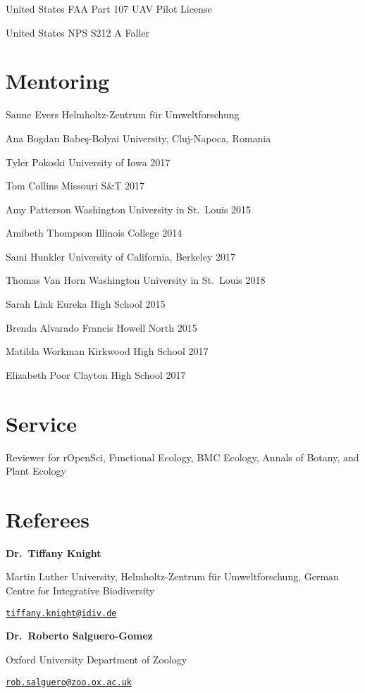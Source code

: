 \documentclass[11pt,]{article}
\begin{document}
United States FAA Part 107 UAV Pilot License

United States NPS S212 A Faller

\hypertarget{mentoring}{%
\section{Mentoring}\label{mentoring}}

Sanne Evers \hfill Helmholtz-Zentrum für Umweltforschung

Ana Bogdan \hfill Babe\c s-Bolyai University, Cluj-Napoca, Romania

Tyler Pokoski \hfill  University of Iowa 2017

Tom Collins \hfill Missouri S\&T 2017

Amy Patterson \hfill Washington University in St.~Louis 2015

Amibeth Thompson \hfill Illinois College 2014

Sami Hunkler \hfill University of California, Berkeley 2017

Thomas Van Horn \hfill Washington University in St.~Louis 2018

Sarah Link \hfill Eureka High School 2015

Brenda Alvarado \hfill Francis Howell North 2015

Matilda Workman \hfill Kirkwood High School 2017

Elizabeth Poor \hfill Clayton High School 2017

\hypertarget{service}{%
\section{Service}\label{service}}

Reviewer for rOpenSci, Functional Ecology, BMC Ecology, Annals of
Botany, and Plant Ecology

\hypertarget{referees}{%
\section{Referees}\label{referees}}

\textbf{Dr.~Tiffany Knight}

Martin Luther University, Helmholtz-Zentrum für Umweltforschung, German
Centre for Integrative Biodiversity

\href{mailto:tiffany.knight@idiv.de}{\nolinkurl{tiffany.knight@idiv.de}}

\textbf{Dr.~Roberto Salguero-Gomez}

Oxford University Department of Zoology

\href{mailto:rob.salguero@zoo.ox.ac.uk}{\nolinkurl{rob.salguero@zoo.ox.ac.uk}}
\end{document}
